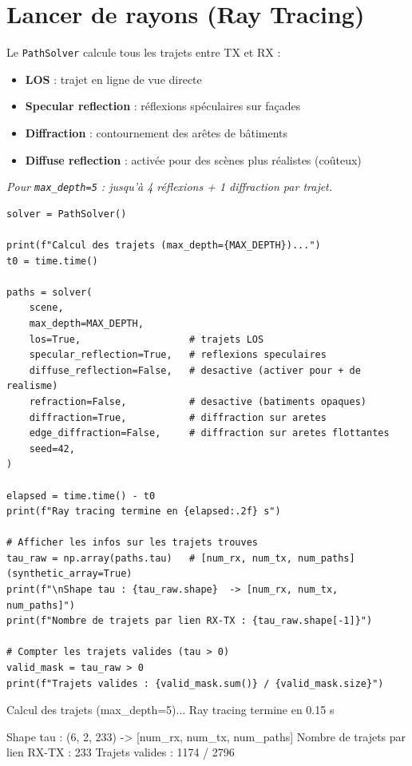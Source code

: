 \documentclass[11pt,a4paper]{article}
\begin{document}
\section{Lancer de rayons (Ray Tracing)}

Le \texttt{PathSolver} calcule tous les trajets entre TX et RX :
\begin{itemize}
    \item \textbf{LOS} : trajet en ligne de vue directe
    \item \textbf{Specular reflection} : réflexions spéculaires sur façades
    \item \textbf{Diffraction} : contournement des arêtes de bâtiments
    \item \textbf{Diffuse reflection} : activée pour des scènes plus réalistes (coûteux)
\end{itemize}
\textit{Pour \texttt{max\_depth=5} : jusqu'à 4 réflexions + 1 diffraction par trajet.}

\begin{lstlisting}
solver = PathSolver()

print(f"Calcul des trajets (max_depth={MAX_DEPTH})...")
t0 = time.time()

paths = solver(
    scene,
    max_depth=MAX_DEPTH,
    los=True,                   # trajets LOS
    specular_reflection=True,   # reflexions speculaires
    diffuse_reflection=False,   # desactive (activer pour + de realisme)
    refraction=False,           # desactive (batiments opaques)
    diffraction=True,           # diffraction sur aretes
    edge_diffraction=False,     # diffraction sur aretes flottantes
    seed=42,
)

elapsed = time.time() - t0
print(f"Ray tracing termine en {elapsed:.2f} s")

# Afficher les infos sur les trajets trouves
tau_raw = np.array(paths.tau)   # [num_rx, num_tx, num_paths] (synthetic_array=True)
print(f"\nShape tau : {tau_raw.shape}  -> [num_rx, num_tx, num_paths]")
print(f"Nombre de trajets par lien RX-TX : {tau_raw.shape[-1]}")

# Compter les trajets valides (tau > 0)
valid_mask = tau_raw > 0
print(f"Trajets valides : {valid_mask.sum()} / {valid_mask.size}")
\end{lstlisting}

\begin{consoleout}
Calcul des trajets (max_depth=5)...
Ray tracing termine en 0.15 s

Shape tau : (6, 2, 233)  -> [num_rx, num_tx, num_paths]
Nombre de trajets par lien RX-TX : 233
Trajets valides : 1174 / 2796
\end{consoleout}
\end{document}
